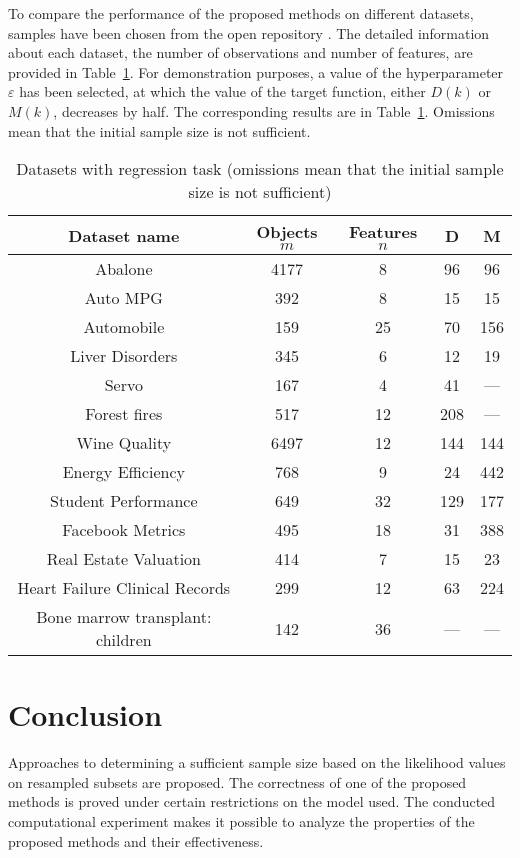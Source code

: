 \documentclass[runningheads]{llncs}
\begin{document}
To compare the performance of the proposed methods on different datasets, samples have been chosen from the open repository \cite{UCI}. The detailed information about each dataset, the number of observations and number of features, are provided in Table~\ref{table}. For demonstration purposes, a value of the hyperparameter $\varepsilon$ has been selected, at which the value of the target function, either $D(k)$ or $M(k)$, decreases by half. The corresponding results are in Table~\ref{table}. Omissions mean that the initial sample size is not sufficient.

\begin{table}[ht]
    \centering
    \caption{Datasets with regression task (omissions mean that the initial sample size is not sufficient)}\label{table}
    \begin{tabular}{|c|c|c|c|c|}
    \hline
    Dataset name & Objects $m$ & Features $n$ & D & M \\
    \hline
    Abalone & 4177 & 8 & 96 & 96  \\
    Auto MPG & 392 & 8 & 15 & 15 \\
    Automobile & 159 & 25 & 70 & 156  \\
    Liver Disorders & 345 & 6 & 12 & 19  \\
    Servo & 167 & 4 & 41 & ---  \\
    Forest fires & 517 & 12 & 208 & --- \\
    Wine Quality & 6497 & 12 & 144 & 144  \\
    Energy Efficiency & 768 & 9 & 24 & 442  \\
    Student Performance & 649 & 32 & 129 & 177  \\
    Facebook Metrics & 495 & 18 & 31 & 388   \\
    Real Estate Valuation & 414 & 7 & 15 & 23  \\
    Heart Failure Clinical Records & 299 & 12 & 63 & 224  \\
    Bone marrow transplant: children & 142 & 36 & --- & --- \\
    \hline
    \end{tabular}
\end{table}

\clearpage
\section{Conclusion}

Approaches to determining a sufficient sample size based on the likelihood values on resampled subsets are proposed. The correctness of one of the proposed methods is proved under certain restrictions on the model used. The conducted computational experiment makes it possible to analyze the properties of the proposed methods and their effectiveness.
\end{document}
